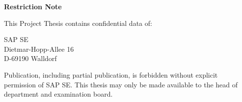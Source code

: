 {\Large \textbf{Restriction Note}}
\vspace{15mm}

This Project Thesis contains confidential data of:

\begin{center}
SAP SE \\
Dietmar-Hopp-Allee 16 \\
D-69190 Walldorf \\
\end{center}

Publication, including partial publication, is forbidden without explicit permission of SAP SE. This thesis may only be made available to the head of department and examination board.